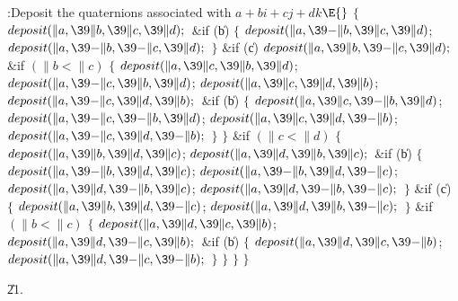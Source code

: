 \B{}:Deposit the quaternions associated with $a+bi+cj+dk$\X${}\E{}$\6
${}\{{}$\1\6
${}\\{deposit}(\|a,\39\|b,\39\|c,\39\|d);{}$\6
\&{if} (\|b)\5
${}\{{}$\1\6
${}\\{deposit}(\|a,\39{-}\|b,\39\|c,\39\|d){}$;\5
${}\\{deposit}(\|a,\39{-}\|b,\39{-}\|c,\39\|d);{}$\6
\4${}\}{}$\2\6
\&{if} (\|c)\1\5
${}\\{deposit}(\|a,\39\|b,\39{-}\|c,\39\|d);{}$\2\6
\&{if} ${}(\|b<\|c){}$\5
${}\{{}$\1\6
${}\\{deposit}(\|a,\39\|c,\39\|b,\39\|d){}$;\5
${}\\{deposit}(\|a,\39{-}\|c,\39\|b,\39\|d){}$;\5
${}\\{deposit}(\|a,\39\|c,\39\|d,\39\|b){}$;\5
${}\\{deposit}(\|a,\39{-}\|c,\39\|d,\39\|b);{}$\6
\&{if} (\|b)\5
${}\{{}$\1\6
${}\\{deposit}(\|a,\39\|c,\39{-}\|b,\39\|d){}$;\5
${}\\{deposit}(\|a,\39{-}\|c,\39{-}\|b,\39\|d){}$;\5
${}\\{deposit}(\|a,\39\|c,\39\|d,\39{-}\|b){}$;\5
${}\\{deposit}(\|a,\39{-}\|c,\39\|d,\39{-}\|b);{}$\6
\4${}\}{}$\2\6
\4${}\}{}$\2\6
\&{if} ${}(\|c<\|d){}$\5
${}\{{}$\1\6
${}\\{deposit}(\|a,\39\|b,\39\|d,\39\|c){}$;\5
${}\\{deposit}(\|a,\39\|d,\39\|b,\39\|c);{}$\6
\&{if} (\|b)\5
${}\{{}$\1\6
${}\\{deposit}(\|a,\39{-}\|b,\39\|d,\39\|c){}$;\5
${}\\{deposit}(\|a,\39{-}\|b,\39\|d,\39{-}\|c){}$;\5
${}\\{deposit}(\|a,\39\|d,\39{-}\|b,\39\|c){}$;\5
${}\\{deposit}(\|a,\39\|d,\39{-}\|b,\39{-}\|c);{}$\6
\4${}\}{}$\2\6
\&{if} (\|c)\5
${}\{{}$\1\6
${}\\{deposit}(\|a,\39\|b,\39\|d,\39{-}\|c){}$;\5
${}\\{deposit}(\|a,\39\|d,\39\|b,\39{-}\|c);{}$\6
\4${}\}{}$\2\6
\&{if} ${}(\|b<\|c){}$\5
${}\{{}$\1\6
${}\\{deposit}(\|a,\39\|d,\39\|c,\39\|b){}$;\5
${}\\{deposit}(\|a,\39\|d,\39{-}\|c,\39\|b);{}$\6
\&{if} (\|b)\5
${}\{{}$\1\6
${}\\{deposit}(\|a,\39\|d,\39\|c,\39{-}\|b){}$;\5
${}\\{deposit}(\|a,\39\|d,\39{-}\|c,\39{-}\|b);{}$\6
\4${}\}{}$\2\6
\4${}\}{}$\2\6
\4${}\}{}$\2\6
\4${}\}{}$\2\par
\U21.\fi

